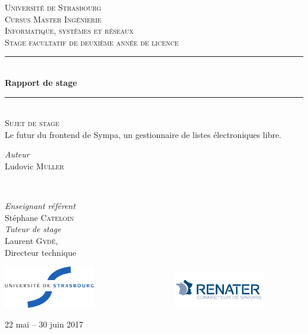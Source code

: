 \documentclass[]{article}
\begin{document}
\begin{titlepage}
	\newcommand{\HRule}{\rule{\linewidth}{0.5mm}}
	
	\center
	\textsc{\LARGE Université de Strasbourg}\\[1.5cm]
	\textsc{\Large Cursus Master Ingénierie \\ Informatique, systèmes et réseaux}\\[0.5cm]
	\textsc{\large Stage facultatif de deuxième année de licence}\\[0.5cm]
	
	\HRule\\[0.4cm]
	{\huge\bfseries Rapport de stage}\\[0.4cm]
	\HRule\\[1.5cm]

	\textsc{\large Sujet de stage}\\[0.5cm]
	Le futur du frontend de Sympa, un gestionnaire de listes électroniques libre.
	\vfill

	\begin{minipage}{0.4\textwidth}
		\begin{flushleft}
			\large
			\textit{Auteur}\\
			Ludovic \textsc{Muller}
		\end{flushleft}
	\end{minipage}
	~
	\begin{minipage}{0.4\textwidth}
		\begin{flushright}
			\large
			\textit{Enseignant référent}\\
			Stéphane \textsc{Cateloin}\\
			\vfill
			\textit{Tuteur de stage}\\
			Laurent \textsc{Gydé},\\
      Directeur technique
		\end{flushright}
	\end{minipage}
    
	\vfill\vfill
	\includegraphics[width=0.3\textwidth]{../images/logos/unistra.png}
	\includegraphics[width=0.3\textwidth]{../images/logos/renater.png}
	\vfill
		
	\vfill\vfill
	
	22 mai – 30 juin 2017
	
\end{titlepage}
\end{document}
